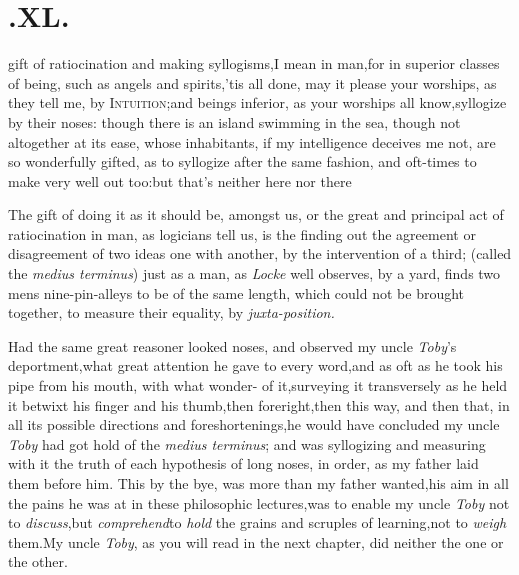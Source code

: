 \documentclass{article}
\begin{document}
\bigskip


\newpage
\section{.\quad  XL.}

 gift of ratiocination and making
syllogisms,\tsh I mean in man,\tsk for in superior classes
of being, such as angels and spirits,\tsh ’tis all
done, may it please your worships, as they tell me, by
\textsc{Intuition};\tsk and beings inferior, as your
worships all know,\tsh syllogize by their noses: though
there is an island swimming in the sea, though not altogether at
its ease, whose inhabitants, if my intelligence deceives me not,
are so wonderfully gifted, as to syllogize after the same fashion,
and oft-times to make very well out too:\tsh but
that’s neither here nor there\tsh

The gift of doing it as it should be, amongst us, \tsk or the
great and principal act of ratiocination in man, as logicians tell
us, is the finding out the agreement or disagreement of two ideas
one with another, by the intervention of a third; (called the
\textit{medius terminus}) just as a man, as \textit{Locke} well
observes, by a yard, finds two mens nine-pin-alleys to be of the same
length, which could not be brought together, to measure their
equality, by \textit{juxta-position.}

Had the same great reasoner looked  noses, and observed my uncle \textit{Toby}’s
deportment,\tsk what great attention he gave to every
word,\tsk and as oft as he took his pipe from his mouth, with what
wonder-\break {} of
it,\tsk surveying it transversely as he held it betwixt his
finger and his thumb,\break\tsk then foreright,\tsk then
this way, and then that, in all its possible directions and
foreshortenings,\tsh he would have concluded my uncle
\textit{Toby} had got hold of the \textit{medius terminus}; and was
syllogizing and measuring with it the truth of each hypothesis of
long noses, in order, as my father laid them before him. This
by the bye, was more than my father wanted,\tsh his aim in
all the pains he was at in these philosophic lectures,\tsk was to
enable my uncle \textit{Toby} not to
\textit{discuss},\tsk but \textit{comprehend}\tsk to \textit{hold} the grains
and scruples of learning,\tsk not to \textit{weigh}
them.\tsk\break My uncle \textit{Toby}, as you will read in the
next chapter, did neither the one or the other.
\end{document}
